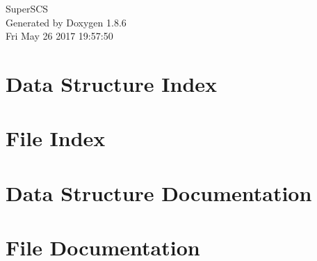 \documentclass[twoside]{book}
\newcommand{\clearemptydoublepage}{%
  \newpage{\pagestyle{empty}\cleardoublepage}%
}
\begin{document}
\hypersetup{pageanchor=false}
\begin{titlepage}
\vspace*{7cm}
\begin{center}%
{\Large Super\-S\-C\-S }\\
\vspace*{1cm}
{\large Generated by Doxygen 1.8.6}\\
\vspace*{0.5cm}
{\small Fri May 26 2017 19:57:50}\\
\end{center}
\end{titlepage}
\clearemptydoublepage
\tableofcontents
\clearemptydoublepage
{}
\hypersetup{pageanchor=true}

\chapter{Data Structure Index}

\chapter{File Index}

\chapter{Data Structure Documentation}












\chapter{File Documentation}























\newpage
{}
{}
\printindex
\end{document}
